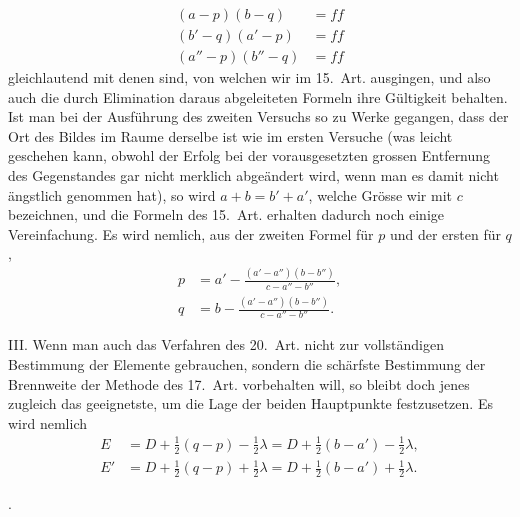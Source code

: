 \documentclass[11pt,a4paper]{article}
\begin{document}
\newpage
\noindent
\begin{align*}
(a - p)(b - q) &= ff \\
(b' - q)(a' - p) &= ff \\
(a'' - p)(b'' - q) &= ff
\end{align*}
gleichlautend mit denen sind, von welchen wir im 15.~Art. ausgingen, und also auch die durch Elimination daraus abgeleiteten Formeln ihre Gültigkeit behalten. Ist man bei der Ausführung des zweiten Versuchs so zu Werke gegangen, dass der Ort des Bildes im Raume derselbe ist wie im ersten Versuche (was leicht geschehen kann, obwohl der Erfolg bei der vorausgesetzten grossen Entfernung des Gegenstandes gar nicht merklich abgeändert wird, wenn man es damit nicht ängstlich genommen hat), so wird $a + b = b' + a'$, welche Grösse wir mit $c$ bezeichnen, und die Formeln des 15.~Art. erhalten dadurch noch einige Vereinfachung. Es wird nemlich, aus der zweiten Formel für $p$ und der ersten für $q$,
\begin{align*}
p &= a' - \frac{(a' - a'')(b - b'')}{c - a'' - b''}, \\
q &= b - \frac{(a' - a'')(b - b'')}{c - a'' - b''}.
\end{align*}

III. Wenn man auch das Verfahren des 20.~Art. nicht zur vollständigen Bestimmung der Elemente gebrauchen, sondern die schärfste Bestimmung der Brennweite der Methode des 17.~Art. vorbehalten will, so bleibt doch jenes zugleich das geeignetste, um die Lage der beiden Hauptpunkte festzusetzen. Es wird nemlich
\begin{align*}
E &= D + \tfrac12(q - p) - \tfrac12\lambda = D + \tfrac12(b - a') - \tfrac12\lambda, \\
E' &= D + \tfrac12(q - p) + \tfrac12\lambda = D + \tfrac12(b - a') + \tfrac12\lambda.
\end{align*}

\bigskip{}.
\end{document}
